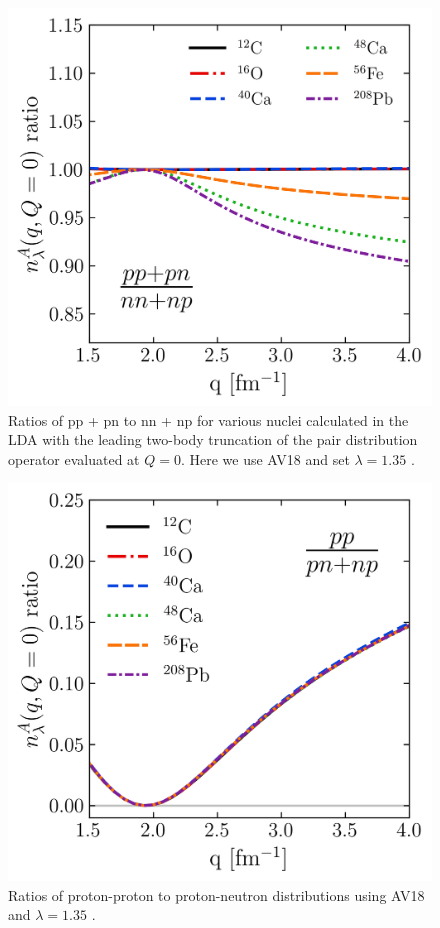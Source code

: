\documentclass[10pt,aps,prc,floatfix,twocolumn,nofootinbib]{revtex4-1}
\begin{document}
\begin{figure}[tbh]
    \centering
    \includegraphics[width=0.85\columnwidth]{figures_low_res/p_n_pmd_ratios_C12_O16_Ca40_Ca48_Fe56_Pb208_channels_1S0_3S1_kvnn_6_lamb_1p35_kmax_15p0.png}
    \caption{Ratios of pp + pn to nn + np for various nuclei calculated in the LDA with the leading two-body truncation of the pair distribution operator evaluated at $Q=0$. Here we use AV18 and set $\lambda=1.35$ \fmi.}
    \label{fig:pp_plus_pn_ratios}
\end{figure}


\begin{figure}[tbh]
    \centering
    \includegraphics[width=0.85\columnwidth]{figures_low_res/pp_pn_pmd_ratios_C12_O16_Ca40_Ca48_Fe56_Pb208_channels_1S0_3S1_kvnn_6_lamb_1p35_kmax_15p0.png}
    \caption{Ratios of proton-proton to proton-neutron distributions using AV18 and $\lambda=1.35$ \fmi.}
    \label{fig:pp_to_pn_ratios}
\end{figure}
\end{document}
